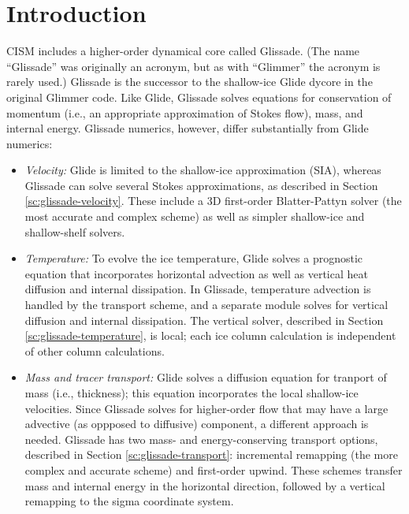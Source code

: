 

\section{Introduction}
\label{sc:glissade-intro}

CISM includes a higher-order dynamical core called Glissade.  (The name ``Glissade'' was originally an acronym,
but as with ``Glimmer'' the acronym is rarely used.) Glissade is the successor to the shallow-ice
Glide dycore in the original Glimmer code.  Like Glide, Glissade solves equations for conservation of momentum
(i.e., an appropriate approximation of Stokes flow), mass, and internal energy. Glissade numerics, however,
differ substantially from Glide numerics:

\begin{itemize}

\item \textit{Velocity:}
Glide is limited to the shallow-ice approximation (SIA), whereas Glissade can solve several Stokes
approximations, as described in Section \ref{sc:glissade-velocity}.
These include a 3D first-order Blatter-Pattyn solver (the most accurate and complex scheme)
as well as simpler shallow-ice and shallow-shelf solvers.

\item \textit{Temperature:}
To evolve the ice temperature, Glide solves a prognostic equation that incorporates horizontal advection as well
as vertical heat diffusion and internal dissipation.  In Glissade, temperature advection is handled by the
transport scheme, and a separate module solves for vertical diffusion and internal dissipation.
The vertical solver, described in Section \ref{sc:glissade-temperature}, is local; 
each ice column calculation is independent of other column calculations.

\item \textit{Mass and tracer transport:}
Glide solves a diffusion equation for tranport of mass (i.e., thickness); this equation incorporates the local shallow-ice
velocities. Since Glissade solves for higher-order flow that may have a large advective (as oppposed to diffusive)
component, a different approach is needed.  Glissade has two mass- and energy-conserving transport options, 
described in Section \ref{sc:glissade-transport}:
incremental remapping (the more complex and accurate scheme) and first-order upwind. These schemes
transfer mass and internal energy in the horizontal direction, followed by a vertical remapping to
the sigma coordinate system.

\end{itemize}

